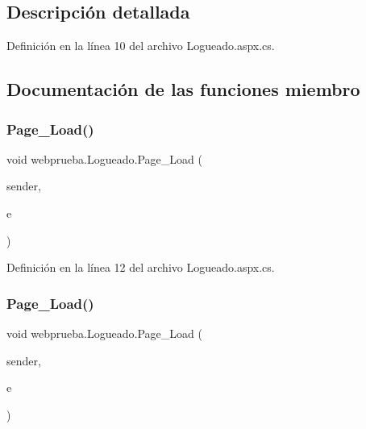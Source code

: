 \subsection{Descripción detallada}


Definición en la línea 10 del archivo Logueado.\+aspx.\+cs.



\subsection{Documentación de las funciones miembro}
\mbox{\label{classwebprueba_1_1_logueado_a940dfad7fc27bdd09f1bd299a494e886}} 
\subsubsection{\texorpdfstring{Page\_Load()}{Page\_Load()}\hspace{0.1cm}{\footnotesize\ttfamily [1/2]}}
{\footnotesize\ttfamily void webprueba.\+Logueado.\+Page\+\_\+\+Load (\begin{DoxyParamCaption}\item[{object}]{sender,  }\item[{Event\+Args}]{e }\end{DoxyParamCaption})\hspace{0.3cm}{\ttfamily [protected]}}



Definición en la línea 12 del archivo Logueado.\+aspx.\+cs.


\begin{DoxyCode}{0}

\end{DoxyCode}
\mbox{\label{classwebprueba_1_1_logueado_a940dfad7fc27bdd09f1bd299a494e886}} 
\subsubsection{\texorpdfstring{Page\_Load()}{Page\_Load()}\hspace{0.1cm}{\footnotesize\ttfamily [2/2]}}
{\footnotesize\ttfamily void webprueba.\+Logueado.\+Page\+\_\+\+Load (\begin{DoxyParamCaption}\item[{object}]{sender,  }\item[{Event\+Args}]{e }\end{DoxyParamCaption})\hspace{0.3cm}{\ttfamily [protected]}}




